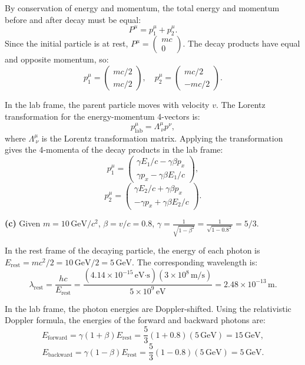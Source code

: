 \documentclass{article}
\begin{document}
By conservation of energy and momentum, the total energy and momentum before and after decay must be equal:
\[
P^\mu = p_1^\mu + p_2^\mu.
\]
Since the initial particle is at rest, \(P^\mu = \begin{pmatrix} mc \\ 0 \end{pmatrix}\). The decay products have equal and opposite momentum, so:
\[
p_1^\mu = \begin{pmatrix} mc/2 \\ mc/2 \end{pmatrix}, \quad p_2^\mu = \begin{pmatrix} mc/2 \\ -mc/2 \end{pmatrix}.
\]

In the lab frame, the parent particle moves with velocity \(v\). The Lorentz transformation for the energy-momentum 4-vectors is:
\[
p^\mu_{\text{lab}} = \Lambda^\mu_{\ \nu} p^\nu,
\]
where \(\Lambda^\mu_{\ \nu}\) is the Lorentz transformation matrix. Applying the transformation gives the 4-momenta of the decay products in the lab frame:
\[
p_1^\mu = \begin{pmatrix} \gamma E_1/c - \gamma \beta p_x \\ \gamma p_x - \gamma \beta E_1/c \end{pmatrix},
\]
\[
p_2^\mu = \begin{pmatrix} \gamma E_2/c + \gamma \beta p_x \\ -\gamma p_x + \gamma \beta E_2/c \end{pmatrix}.
\]

\textbf{(c)} Given \(m = 10 \, \text{GeV}/c^2\), \(\beta = v/c = 0.8\), \(\gamma = \frac{1}{\sqrt{1-\beta^2}} = \frac{1}{\sqrt{1-0.8^2}} = 5/3\).

In the rest frame of the decaying particle, the energy of each photon is \(E_\text{rest} = mc^2/2 = 10 \, \text{GeV}/2 = 5 \, \text{GeV}\). The corresponding wavelength is:
\[
\lambda_\text{rest} = \frac{hc}{E_\text{rest}} = \frac{(4.14 \times 10^{-15} \, \text{eV·s})(3 \times 10^8 \, \text{m/s})}{5 \times 10^9 \, \text{eV}} = 2.48 \times 10^{-13} \, \text{m}.
\]

In the lab frame, the photon energies are Doppler-shifted. Using the relativistic Doppler formula, the energies of the forward and backward photons are:
\[
E_\text{forward} = \gamma (1+\beta) E_\text{rest} = \frac{5}{3} (1+0.8)(5 \, \text{GeV}) = 15 \, \text{GeV},
\]
\[
E_\text{backward} = \gamma (1-\beta) E_\text{rest} = \frac{5}{3} (1-0.8)(5 \, \text{GeV}) = 5 \, \text{GeV}.
\]
\end{document}
